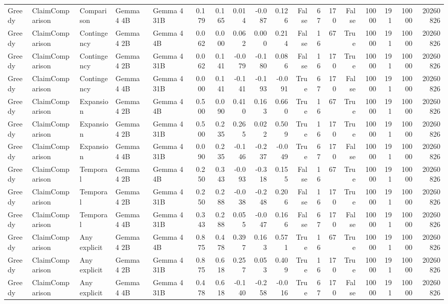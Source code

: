 \begin{tabular}{lllllrrrrrrrrrrrrr}
Greedy & ClaimComparison & Comparison & Gemma 4 4B & Gemma 4 31B & 0.179 & 0.165 & 0.014 & -0.087 & 0.126 & False & 67 & 170 & False & 10000 & 191 & 10000 & 20260826 \\
Greedy & ClaimComparison & Contingency & Gemma 4 2B & Gemma 4 4B & 0.062 & 0.000 & 0.062 & 0.000 & 0.214 & False & 16 & 67 & True & 10000 & 191 & 10000 & 20260826 \\
Greedy & ClaimComparison & Contingency & Gemma 4 2B & Gemma 4 31B & 0.062 & 0.141 & -0.079 & -0.180 & 0.086 & False & 16 & 170 & True & 10000 & 191 & 10000 & 20260826 \\
Greedy & ClaimComparison & Contingency & Gemma 4 4B & Gemma 4 31B & 0.000 & 0.141 & -0.141 & -0.193 & -0.091 & True & 67 & 170 & False & 10000 & 191 & 10000 & 20260826 \\
Greedy & ClaimComparison & Expansion & Gemma 4 2B & Gemma 4 4B & 0.500 & 0.090 & 0.410 & 0.163 & 0.660 & True & 16 & 67 & True & 10000 & 191 & 10000 & 20260826 \\
Greedy & ClaimComparison & Expansion & Gemma 4 2B & Gemma 4 31B & 0.500 & 0.235 & 0.265 & 0.022 & 0.509 & True & 16 & 170 & True & 10000 & 191 & 10000 & 20260826 \\
Greedy & ClaimComparison & Expansion & Gemma 4 4B & Gemma 4 31B & 0.090 & 0.235 & -0.146 & -0.237 & -0.049 & True & 67 & 170 & False & 10000 & 191 & 10000 & 20260826 \\
Greedy & ClaimComparison & Temporal & Gemma 4 2B & Gemma 4 4B & 0.250 & 0.343 & -0.093 & -0.318 & 0.155 & False & 16 & 67 & True & 10000 & 191 & 10000 & 20260826 \\
Greedy & ClaimComparison & Temporal & Gemma 4 2B & Gemma 4 31B & 0.250 & 0.288 & -0.038 & -0.248 & 0.206 & False & 16 & 170 & True & 10000 & 191 & 10000 & 20260826 \\
Greedy & ClaimComparison & Temporal & Gemma 4 4B & Gemma 4 31B & 0.343 & 0.288 & 0.055 & -0.047 & 0.166 & False & 67 & 170 & False & 10000 & 191 & 10000 & 20260826 \\
Greedy & ClaimComparison & Any explicit & Gemma 4 2B & Gemma 4 4B & 0.875 & 0.478 & 0.397 & 0.163 & 0.571 & True & 16 & 67 & True & 10000 & 191 & 10000 & 20260826 \\
Greedy & ClaimComparison & Any explicit & Gemma 4 2B & Gemma 4 31B & 0.875 & 0.618 & 0.257 & 0.053 & 0.409 & True & 16 & 170 & True & 10000 & 191 & 10000 & 20260826 \\
Greedy & ClaimComparison & Any explicit & Gemma 4 4B & Gemma 4 31B & 0.478 & 0.618 & -0.140 & -0.258 & -0.016 & True & 67 & 170 & False & 10000 & 191 & 10000 & 20260826 \\

\end{tabular}
